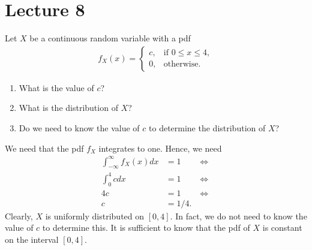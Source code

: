 \documentclass[lectures]{subfiles}
\begin{document}
\section{Lecture 8}

\begin{exercise}
Let $X$ be a continuous random variable with a pdf
\begin{align}
    f_X(x) = \begin{cases}
    c, &\text{if } 0 \leq x \leq 4, \\
    0, &\text{otherwise}.
    \end{cases}
\end{align}
\begin{enumerate}
    \item What is the value of $c$?
    \item What is the distribution of $X$?
    \item Do we need to know the value of $c$ to determine the distribution of $X$?
\end{enumerate}

\begin{solution}
We need that the pdf $f_X$ integrates to one. Hence, we need
\begin{align}
    \int_{-\infty}^\infty f_X(x) dx &= 1 \qquad \iff \\
    \int_{0}^4 c dx &= 1 \qquad \iff \\
    4c &= 1 \qquad \iff \\
    c &= 1/4.
\end{align}
Clearly, $X$ is uniformly distributed on $[0,4]$. In fact, we do not need to know the value of $c$ to determine this. It is sufficient to know that the pdf of $X$ is constant on the interval $[0,4]$.
\end{solution}
\end{exercise}
\end{document}
